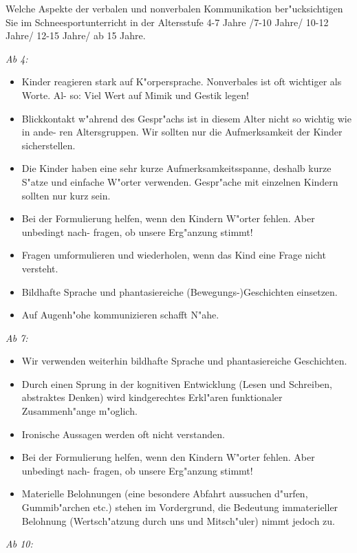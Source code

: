 \begin{question}{4}
Welche Aspekte der verbalen und nonverbalen Kommunikation ber"ucksichtigen Sie im Schneesportunterricht in der Altersstufe 4-7 Jahre /7-10 Jahre/ 10-12 Jahre/ 12-15 Jahre/ ab 15 Jahre.
\end{question}
\begin{solution}
\emph{Ab 4:}
\begin{itemize}
\item Kinder reagieren stark auf K"orpersprache. Nonverbales ist oft wichtiger als Worte. Al- so: Viel Wert auf Mimik und Gestik legen!
\item Blickkontakt w"ahrend des Gespr"achs ist in diesem Alter nicht so wichtig wie in ande- ren Altersgruppen. Wir sollten nur die Aufmerksamkeit der Kinder sicherstellen.
\item Die Kinder haben eine sehr kurze Aufmerksamkeitsspanne, deshalb kurze S"atze und einfache W"orter verwenden. Gespr"ache mit einzelnen Kindern sollten nur kurz sein.
\item Bei der Formulierung helfen, wenn den Kindern W"orter fehlen. Aber unbedingt nach- fragen, ob unsere Erg"anzung stimmt!
\item Fragen umformulieren und wiederholen, wenn das Kind eine Frage nicht versteht.
\item Bildhafte Sprache und phantasiereiche (Bewegungs-)Geschichten einsetzen.
\item Auf Augenh"ohe kommunizieren schafft N"ahe.
\end{itemize}
\emph{Ab 7:}
\begin{itemize}
\item Wir verwenden weiterhin bildhafte Sprache und phantasiereiche Geschichten.
\item Durch einen Sprung in der kognitiven Entwicklung (Lesen und Schreiben, abstraktes Denken) wird kindgerechtes Erkl"aren funktionaler Zusammenh"ange m"oglich.
\item Ironische Aussagen werden oft nicht verstanden.
\item Bei der Formulierung helfen, wenn den Kindern W"orter fehlen. Aber unbedingt nach- fragen, ob unsere Erg"anzung stimmt!
\item Materielle Belohnungen (eine besondere Abfahrt aussuchen d"urfen, Gummib"archen
etc.) stehen im Vordergrund, die Bedeutung immaterieller Belohnung (Wertsch"atzung
durch uns und Mitsch"uler) nimmt jedoch zu.
\end{itemize}
\emph{Ab 10:}
\begin{itemize}

\end{itemize}
\end{solution}
